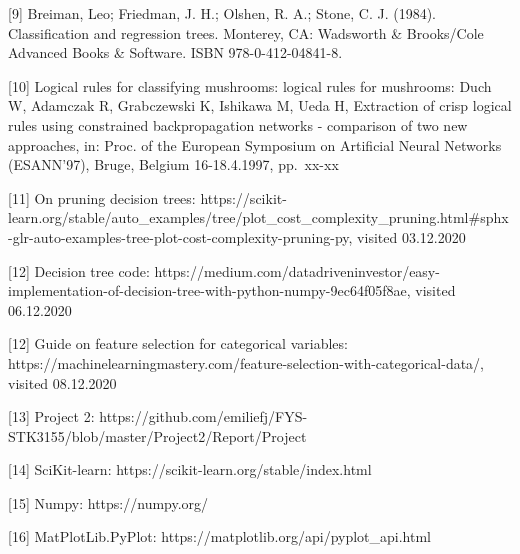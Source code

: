 \documentclass[11pt]{article}
\begin{document}
{[}9{]} Breiman, Leo; Friedman, J. H.; Olshen, R. A.; Stone, C. J.
(1984). Classification and regression trees. Monterey, CA: Wadsworth \&
Brooks/Cole Advanced Books \& Software. ISBN 978-0-412-04841-8.

{[}10{]} Logical rules for classifying mushrooms: logical rules for
mushrooms: Duch W, Adamczak R, Grabczewski K, Ishikawa M, Ueda H,
Extraction of crisp logical rules using constrained backpropagation
networks - comparison of two new approaches, in: Proc. of the European
Symposium on Artificial Neural Networks (ESANN'97), Bruge, Belgium
16-18.4.1997, pp.~xx-xx

{[}11{]} On pruning decision trees:
https://scikit-learn.org/stable/auto\_examples/tree/plot\_cost\_complexity\_pruning.html\#sphx-glr-auto-examples-tree-plot-cost-complexity-pruning-py,
visited 03.12.2020

{[}12{]} Decision tree code:
https://medium.com/datadriveninvestor/easy-implementation-of-decision-tree-with-python-numpy-9ec64f05f8ae,
visited 06.12.2020

{[}12{]} Guide on feature selection for categorical variables:
https://machinelearningmastery.com/feature-selection-with-categorical-data/,
visited 08.12.2020

[13] Project 2: https://github.com/emiliefj/FYS-STK3155/blob/master/Project2/Report/Project%

{[}14{]} SciKit-learn: https://scikit-learn.org/stable/index.html

{[}15{]} Numpy: https://numpy.org/

{[}16{]} MatPlotLib.PyPlot: https://matplotlib.org/api/pyplot\_api.html
    
    
    
\end{document}
